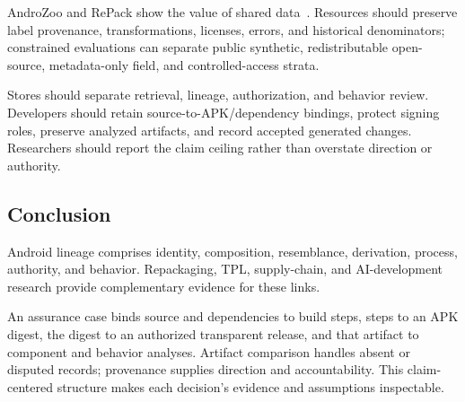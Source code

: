 AndroZoo and RePack show the value of shared data~\cite{androzoo,repack}. Resources should preserve label provenance, transformations, licenses, errors, and historical denominators; constrained evaluations can separate public synthetic, redistributable open-source, metadata-only field, and controlled-access strata.

Stores should separate retrieval, lineage, authorization, and behavior review. Developers should retain source-to-APK/dependency bindings, protect signing roles, preserve analyzed artifacts, and record accepted generated changes. Researchers should report the claim ceiling rather than overstate direction or authority.

\subsection{Conclusion}

Android lineage comprises identity, composition, resemblance, derivation, process, authority, and behavior. Repackaging, TPL, supply-chain, and AI-development research provide complementary evidence for these links.

An assurance case binds source and dependencies to build steps, steps to an APK digest, the digest to an authorized transparent release, and that artifact to component and behavior analyses. Artifact comparison handles absent or disputed records; provenance supplies direction and accountability. This claim-centered structure makes each decision's evidence and assumptions inspectable.
